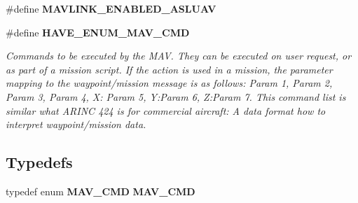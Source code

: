 \begin{DoxyCompactItemize}
\item 
\#define \textbf{ M\+A\+V\+L\+I\+N\+K\+\_\+\+E\+N\+A\+B\+L\+E\+D\+\_\+\+A\+S\+L\+U\+AV}
\item 
\#define \textbf{ H\+A\+V\+E\+\_\+\+E\+N\+U\+M\+\_\+\+M\+A\+V\+\_\+\+C\+MD}
\begin{DoxyCompactList}\small\item\em Commands to be executed by the M\+AV. They can be executed on user request, or as part of a mission script. If the action is used in a mission, the parameter mapping to the waypoint/mission message is as follows\+: Param 1, Param 2, Param 3, Param 4, X\+: Param 5, Y\+:Param 6, Z\+:Param 7. This command list is similar what A\+R\+I\+NC 424 is for commercial aircraft\+: A data format how to interpret waypoint/mission data. \end{DoxyCompactList}\end{DoxyCompactItemize}
\subsection*{Typedefs}
\begin{DoxyCompactItemize}
\item 
typedef enum \textbf{ M\+A\+V\+\_\+\+C\+MD} \textbf{ M\+A\+V\+\_\+\+C\+MD}
\end{DoxyCompactItemize}
